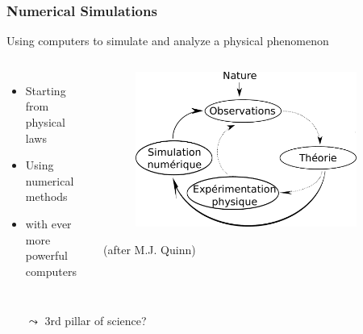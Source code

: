 \documentclass[xcolor={x11names,svgnames,psnames}]{beamer}
\begin{document}
\begin{frame}
  \frametitle{Numerical Simulations}

  \begin{exampleblock}{Using computers to simulate and analyze a physical phenomenon}
  
  \begin{columns}[t]
    \begin{itemize}
    \item Starting from physical laws

      \medskip

    \item Using numerical methods

      \medskip
      
    \item with ever more powerful computers
    \end{itemize}
    
    \begin{center}
      \begin{figure}[ht]
        \centering
        \includegraphics[width=0.9\textwidth]{Science-SimuNum.pdf}
      \end{figure}
      {\tiny (after
        M.J. Quinn)} 
    \end{center}
  \end{columns}
\end{exampleblock}

\begin{itemize}
\item[$\leadsto$] 3rd pillar of science?
\end{itemize}  
\end{frame}
\end{document}
